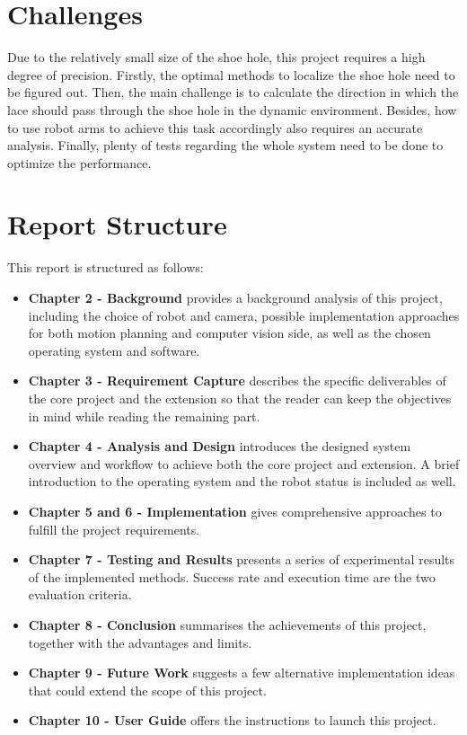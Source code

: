 \section{Challenges}
Due to the relatively small size of the shoe hole, this project requires a high degree of precision. Firstly, the optimal methods to localize the shoe hole need to be figured out. Then, the main challenge is to calculate the direction in which the lace should pass through the shoe hole in the dynamic environment. Besides, how to use robot arms to achieve this task accordingly also requires an accurate analysis. Finally, plenty of tests regarding the whole system need to be done to optimize the performance.

\section{Report Structure}
This report is structured as follows:

\begin{itemize}
    \item \textbf{Chapter 2 - Background} provides a background analysis of this project, including the choice of robot and camera, possible implementation approaches for both motion planning and computer vision side, as well as the chosen operating system and software. 
    \item \textbf{Chapter 3 - Requirement Capture} describes the specific deliverables of the core project and the extension so that the reader can keep the objectives in mind while reading the remaining part.
    \item \textbf{Chapter 4 - Analysis and Design} introduces the designed system overview and workflow to achieve both the core project and extension. A brief introduction to the operating system and the robot status is included as well.
    \item \textbf{Chapter 5 and 6 - Implementation} gives comprehensive approaches to fulfill the project requirements.
    \item \textbf{Chapter 7 - Testing and Results} presents a series of experimental results of the implemented methods. Success rate and execution time are the two evaluation criteria.
    \item \textbf{Chapter 8 - Conclusion} summarises the achievements of this project, together with the advantages and limits. 
    \item \textbf{Chapter 9 - Future Work} suggests a few alternative implementation ideas that could extend the scope of this project. 
    \item \textbf{Chapter 10 - User Guide} offers the instructions to launch this project.
\end{itemize}
